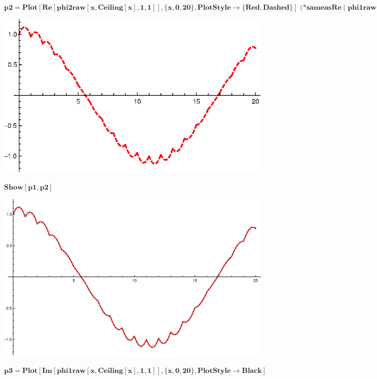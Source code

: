 {\begin{doublespace}
\noindent\(\pmb{\text{p2}=\text{Plot}[\text{Re}[\text{phi2raw}[x,\text{Ceiling}[x],1,1]],\{x,0,20\},\text{PlotStyle}\to \{\text{Red},\text{Dashed}\}]\text{
 }\text{(*} \text{same} \text{as} \text{Re}(\text{phi1raw}) \text{*)}}\)
\end{doublespace}

\includegraphics{chapters/appendices/KP_Mathematica/Kronig_Penney_model_transfer_matrix_gr23.eps}

\begin{doublespace}
\noindent\(\pmb{\text{Show}[\text{p1},\text{p2}]}\)
\end{doublespace}

\includegraphics{chapters/appendices/KP_Mathematica/Kronig_Penney_model_transfer_matrix_gr24.eps}

\begin{doublespace}
\noindent\(\pmb{\text{p3}=\text{Plot}[\text{Im}[\text{phi1raw}[x,\text{Ceiling}[x],1,1]],\{x,0,20\},\text{PlotStyle}\to \text{Black}]}\)
\end{doublespace}

}
